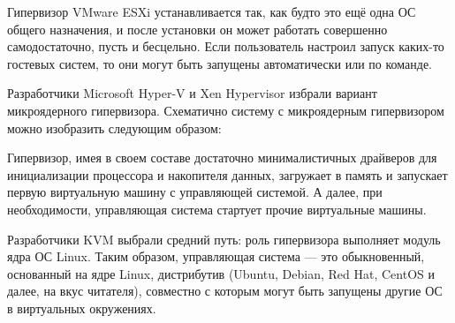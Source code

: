 \documentclass[14pt, a4paper]{article}
\begin{document}
Гипервизор VMware ESXi устанавливается так, как будто это ещё одна ОС общего назначения, и
после установки он может работать совершенно самодостаточно, пусть и бесцельно. Если
пользователь настроил запуск каких-то гостевых систем, то они могут быть запущены автоматически
или по команде.

Разработчики Microsoft Hyper-V и Xen Hypervisor избрали вариант микроядерного гипервизора.
Схематично систему с микроядерным гипервизором можно изобразить следующим образом:

\begin{figure}[h]%
    \centering
    \label{framework} %
\end{figure}

Гипервизор, имея в своем составе достаточно минималистичных драйверов для инициализации
процессора и накопителя данных, загружает в память и запускает первую виртуальную машину с
управляющей системой. А далее, при необходимости, управляющая система стартует прочие
виртуальные машины.

Разработчики KVM выбрали средний путь: роль гипервизора выполняет модуль ядра ОС Linux. Таким
образом, управляющая система — это обыкновенный, основанный на ядре Linux, дистрибутив
(Ubuntu, Debian, Red Hat, CentOS и далее, на вкус читателя), совместно с которым могут быть
запущены другие ОС в виртуальных окружениях.

\begin{figure}[h]%
    \centering
    \label{framework} %
\end{figure}
\end{document}
